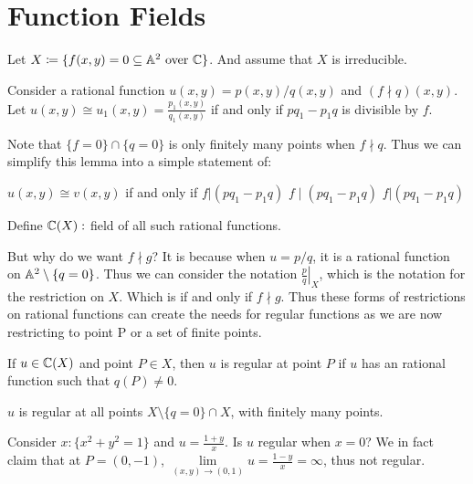 \section{Function Fields}

Let $X\coloneqq \{f(x,y) = 0\subseteq\aa^2\text{ over } \c\}$.
And assume that $X$ is irreducible.

\begin{lemma*}[]{
    Consider a rational function $u(x,y) = p(x,y)/q(x,y)$ and $(f\nmid q)(x,y)$. Let $u(x,y)\cong u_1(x,y) = \frac{p_1(x,y)}{q_1(x,y)}$ if and only if $pq_1-p_1q$ is divisible by $f$.
}
\end{lemma*}

Note that $\{f = 0\}\cap \{q = 0\}$ is only finitely many points when $f\nmid q$. Thus we can simplify this lemma into a simple statement of:

\begin{lemma*}{
    \label{1.3.2}
    $u(x,y)\cong v(x,y)$ if and only if $f|(pq_1 - p_1q)$ $f\mid(pq_1 - p_1q)$ $f\rvert (pq_1 - p_1q)$
}
\end{lemma*}

\begin{definition}
    Define $\c(X) : $ field of all such rational functions.
\end{definition}

But why do we want $f\nmid g$?
It is because when $u = p/q$, it is a rational function on $\aa^2\setminus\{q=0\}$.
Thus we can consider the notation $\left.\frac{p}{q}\right|_X$, which is the notation for the restriction on $X$.
Which is if and only if $f\nmid g$.
Thus these forms of restrictions on rational functions can create the needs for regular functions as we are now restricting to point P or a set of finite points.

\begin{definition}[Regular]
    If $u\in\c(X)$ and point $P\in X$, then $u$ is regular at point $P$ if $u$ has an rational function such that $q(P)\neq 0$.
\end{definition}

\begin{definition}
    $u$ is regular at all points $X\setminus\{q=0\}\cap X$, with finitely many points.
\end{definition}

Consider $x:\{x^2 + y^2 = 1\}$ and $u = \frac{1 +y}{x}$. Is $u$ regular when $x = 0$?
We in fact claim that at $P = (0,-1)$, $\lim\limits_{(x,y)\to(0,1)} u = \frac{1-y}{x} = \infty$, thus not regular.


